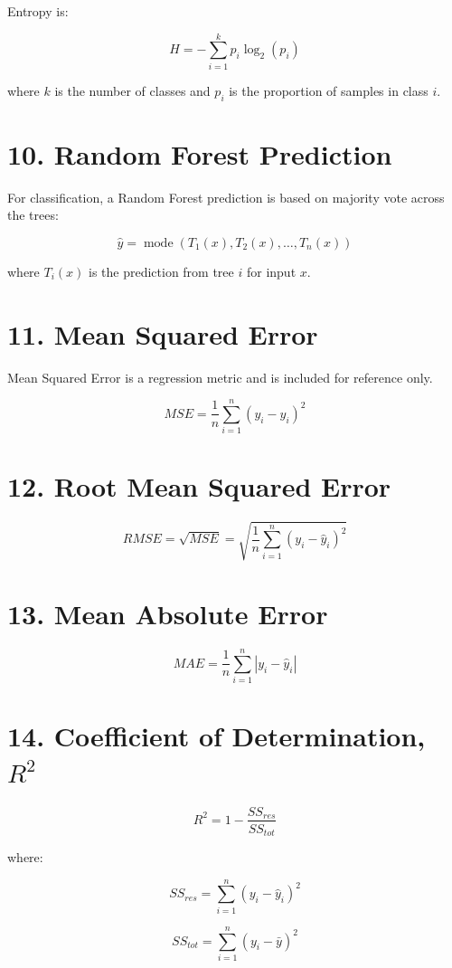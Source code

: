 \documentclass[11pt]{article}
\begin{document}
\noindent Entropy is:

\[
H =
-\sum_{i=1}^{k} p_i \log_2(p_i)
\]

\noindent where \(k\) is the number of classes and \(p_i\) is the proportion of
samples in class \(i\).

\section*{10. Random Forest Prediction}

For classification, a Random Forest prediction is based on majority vote across
the trees:

\[
\hat{y} =
\operatorname{mode}(T_1(x), T_2(x), \ldots, T_n(x))
\]

\noindent where \(T_i(x)\) is the prediction from tree \(i\) for input \(x\).

\section*{11. Mean Squared Error}

Mean Squared Error is a regression metric and is included for reference only.

\[
MSE =
\frac{1}{n}
\sum_{i=1}^{n}
(y_i - \hat{y}_i)^2
\]

\section*{12. Root Mean Squared Error}

\[
RMSE =
\sqrt{MSE}
=
\sqrt{
\frac{1}{n}
\sum_{i=1}^{n}
(y_i - \hat{y}_i)^2
}
\]

\section*{13. Mean Absolute Error}

\[
MAE =
\frac{1}{n}
\sum_{i=1}^{n}
\left|y_i - \hat{y}_i\right|
\]

\section*{14. Coefficient of Determination, \(R^2\)}

\[
R^2 =
1 - \frac{SS_{res}}{SS_{tot}}
\]

\noindent where:

\[
SS_{res} =
\sum_{i=1}^{n}
(y_i - \hat{y}_i)^2
\]

\[
SS_{tot} =
\sum_{i=1}^{n}
(y_i - \bar{y})^2
\]
\end{document}
